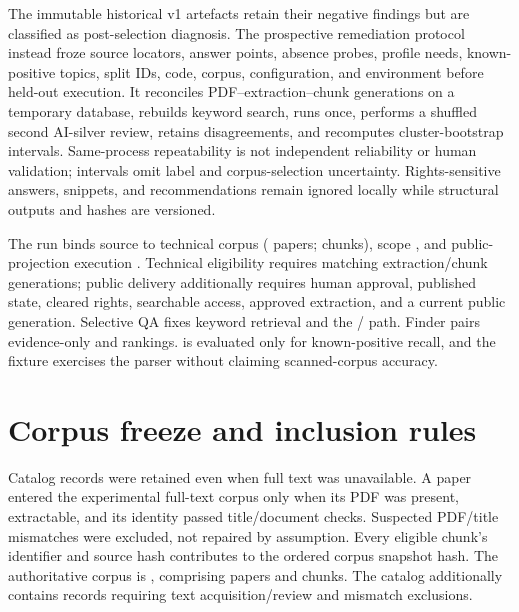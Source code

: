 The immutable historical v1 artefacts retain their negative findings but are classified as post-selection diagnosis. The prospective remediation protocol instead froze source locators, answer points, absence probes, profile needs, known-positive topics, split IDs, code, corpus, configuration, and environment before held-out execution. It reconciles PDF--extraction--chunk generations on a temporary database, rebuilds keyword search, runs once, performs a shuffled second AI-silver review, retains disagreements, and recomputes cluster-bootstrap intervals. Same-process repeatability is not independent reliability or human validation; intervals omit label and corpus-selection uncertainty. Rights-sensitive answers, snippets, and recommendations remain ignored locally while structural outputs and hashes are versioned.

The run binds source \texttt{\VTwoEvaluationSourceCommitPrefix} to technical corpus \texttt{\VTwoCorpusSnapshotId} (\VTwoTechnicalEligiblePapers{} papers; \VTwoTechnicalEligibleChunks{} chunks), scope \VTwoEvaluationScope{}, and public-projection execution \VTwoPublicProjectionExercised{}. Technical eligibility requires matching extraction/chunk generations; public delivery additionally requires human approval, published state, cleared rights, searchable access, approved extraction, and a current public generation. Selective QA fixes keyword retrieval and the \texttt{\VTwoQAProvider}/\texttt{\VTwoQAModel} path. Finder pairs evidence-only and \texttt{\VTwoFinderModel} rankings. \VTwoTopicMethod{} is evaluated only for known-positive recall, and the \texttt{\VTwoOCRProvider} fixture exercises the parser without claiming scanned-corpus accuracy.

\section{Corpus freeze and inclusion rules}

Catalog records were retained even when full text was unavailable. A paper entered the experimental full-text corpus only when its PDF was present, extractable, and its identity passed title/document checks. Suspected PDF/title mismatches were excluded, not repaired by assumption. Every eligible chunk's identifier and source hash contributes to the ordered corpus snapshot hash. The authoritative corpus is \texttt{\CorpusSnapshotId}, comprising \EligiblePaperCount{} papers and \EligibleChunkCount{} chunks. The catalog additionally contains \NoTextPaperCount{} records requiring text acquisition/review and \MismatchPaperCount{} mismatch exclusions.

